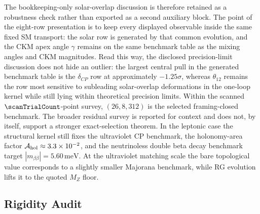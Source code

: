 \documentclass[11pt]{article}
\newcommand{\Ahol}{\mathcal{A}_{\rm hol}}
\begin{document}
The bookkeeping-only solar-overlap discussion is therefore retained as a robustness check rather than exported as a second auxiliary block. The point of the eight-row presentation is to keep every displayed observable inside the same fixed SM transport: the solar row is generated by that common evolution, and the CKM apex angle $\gamma$ remains on the same benchmark table as the mixing angles and CKM magnitudes. Read this way, the disclosed precision-limit discussion does not hide an outlier: the largest central pull in the generated benchmark table is the $\delta_{CP}$ row at approximately $-1.25\sigma$, whereas $\theta_{12}$ remains the row most sensitive to subleading solar-overlap deformations in the one-loop kernel while still lying within theoretical precision limits. Within the scanned $\scanTrialCount$-point survey, $(26,8,312)$ is the selected framing-closed benchmark. The broader residual survey is reported for context and does not, by itself, support a stronger exact-selection theorem.
In the leptonic case the structural kernel still fixes the ultraviolet CP benchmark, the holonomy-area factor $\Ahol\approx3.3\times10^{-2}$, and the neutrinoless double beta decay benchmark target $|m_{\beta\beta}|=5.60\,\mathrm{meV}$. At the ultraviolet matching scale the bare topological value corresponds to a slightly smaller Majorana benchmark, while RG evolution lifts it to the quoted $M_Z$ floor.

\subsection*{Rigidity Audit}
\end{document}
